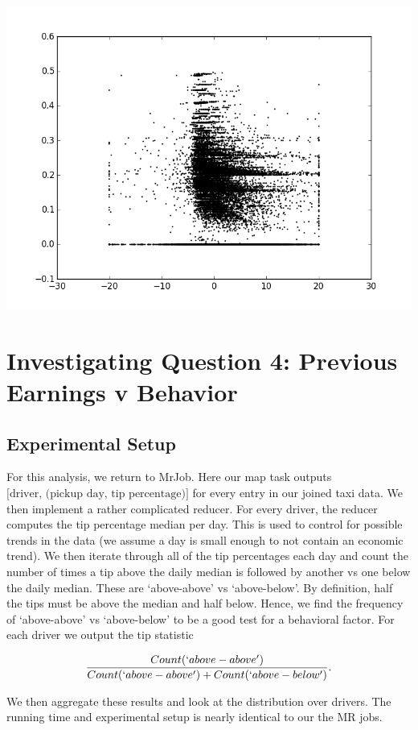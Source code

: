 \documentclass[twoside]{article}
\begin{document}
\begin{multicols}{2}
\includegraphics[scale=.345]{figure_2.png}

\section{Investigating Question 4: Previous Earnings v Behavior}
\subsection{Experimental Setup}
For this analysis, we return to MrJob. Here our map task outputs $\text{[driver, (pickup day, tip percentage)]}$
for every entry in our joined taxi data. We then implement a rather complicated reducer.  For every driver, the reducer computes the tip percentage median per day. This is used to control for possible trends in the data (we assume a day is small enough to not contain an economic trend). We then iterate through all of the tip percentages each day and count the number of times a tip above the daily median is followed by another vs one below the daily median. These are `above-above' vs `above-below'. By definition, half the tips must be above the median and half below. Hence, we find the frequency of `above-above' vs `above-below' to be a good test for a behavioral factor. For each driver we output the tip statistic

$$\frac{Count(`above-above')}{Count(`above-above') + Count(`above-below')}.$$

We then aggregate these results and look at the distribution over drivers. The running time and experimental setup is nearly identical to our the MR jobs. 

\end{multicols}
\end{document}
